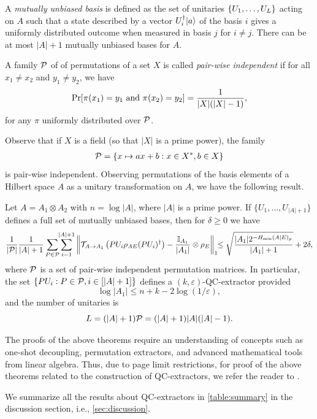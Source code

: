 \begin{definition} A \emph{mutually unbiased basis} is defined as the set of unitaries $\{U_{1}, \dots, U_{L}\}$ acting on $A$ such that a state described by a vector $U_{i}^{\dagger} |a \rangle$ of the basis $i$ gives a uniformly distributed outcome when measured in basis $j$ for $i \neq j$. There can be at most $|A| + 1$ mutually unbiased bases for $A$.  
\end{definition} 
\begin{definition}
    A family $\mathcal{P}$ of of permutations of a set $X$ is called \emph{pair-wise independent} if for all $x_{1} \neq x_{2}$ and $y_{1} \neq y_{2}$, we have \[\Pr[\pi(x_{1}) = y_{1} \hbox{ and } \pi(x_{2}) = y_{2}] = \frac{1}{|X| (|X| - 1)},\]
for any $\pi$ uniformly distributed over $\mathcal{P}$. 
\end{definition}

Observe that if $X$ is a field (so that $|X|$ is a prime power), the family 
\begin{align*}
    \mathcal{P} = \{x \mapsto ax + b: x \in X^{*}, b \in X\}
\end{align*}
is pair-wise independent. Observing permutations of the basis elements of a Hilbert space $A$ as a unitary transformation on $A$, we have the following result.

\begin{theorem}
    Let $A = A_{1} \otimes A_{2}$ with $n = \log |A|$, where $|A|$ is a prime power. If $\{U_{1}, \dots, U_{|A| + 1}\}$ defines a full set of mutually unbiased bases, then for $\delta \ge 0$ we have
    \begin{multline}
        \frac{1}{|\mathcal{P}|} \frac{1}{|A| + 1} 
        \sum_{P \in \mathcal{P}} \!\!\sum_{i = 1}^{|A| + 1} 
        \left\|\mathcal{T}_{A \to A_{1}} \left(P U_{i} \rho_{A E} (P U_{i})^{\dagger}\right) - \frac{\mathbb{I}_{A_{1}}}{|A_{1}|} \otimes \rho_{E}\right\|_{1} \notag
       \!\!\leq \sqrt{\frac{|A_1|2^{-H_{\min}(A|E)_{\rho}}}{|A_1|+1} } + 2\delta, 
    \end{multline}
    where $\mathcal{P}$ is a set of pair-wise independent permutation matrices. In particular, the set $\{P U_i: P \in \mathcal{P}, i\in [|A|+1]\}$ defines a $(k,\varepsilon)$-QC-extractor provided 
    \[\log|A_1| \leq n+k-2\log(1/\varepsilon),\]
    and the number of unitaries is 
    \[L = (|A|+1)\mathcal{P} = (|A|+1)|A|(|A|-1).\]
\end{theorem}

The proofs of the above theorems require an understanding of concepts such as one-shot decoupling, permutation extractors, and advanced mathematical tools from linear algebra. Thus, due to page limit restrictions, for proof of the above theorems related to the construction of QC-extractors, we refer the reader to \cite{Berta_2014,berta2013quantum}.

We summarize all the results about QC-extractors in \autoref{table:summary} in the discussion section, i.e., \autoref{sec:discussion}.